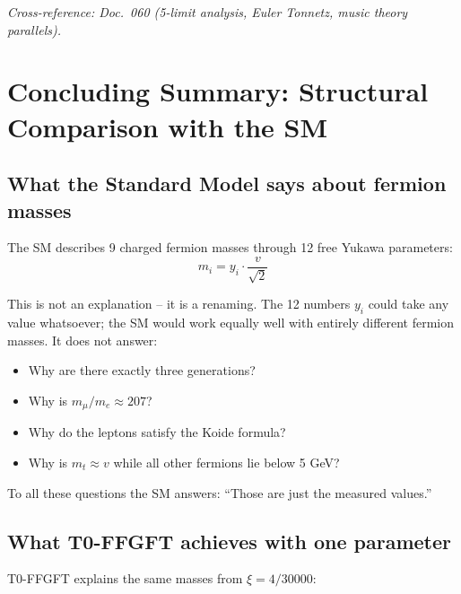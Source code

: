 \noindent\textit{Cross-reference: Doc.~060 (5-limit analysis, Euler Tonnetz,
music theory parallels).}

\section{Concluding Summary: Structural Comparison with the SM}

\subsection{What the Standard Model says about fermion masses}

The SM describes 9 charged fermion masses through 12 free Yukawa
parameters:
\begin{equation}
    m_i = y_i \cdot \frac{v}{\sqrt{2}}
\end{equation}

This is not an explanation -- it is a renaming. The 12 numbers $y_i$
could take any value whatsoever; the SM would work equally well with
entirely different fermion masses. It does not answer:
\begin{itemize}
    \item Why are there exactly three generations?
    \item Why is $m_\mu/m_e \approx 207$?
    \item Why do the leptons satisfy the Koide formula?
    \item Why is $m_t \approx v$ while all other fermions lie below 5 GeV?
\end{itemize}

To all these questions the SM answers: ``Those are just the measured values.''

\subsection{What T0-FFGFT achieves with one parameter}

T0-FFGFT explains the same masses from $\xi = 4/30000$:

